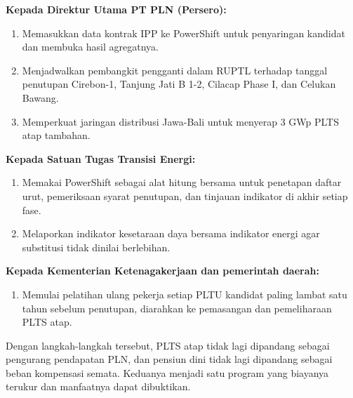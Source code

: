 \textbf{Kepada Direktur Utama PT PLN (Persero):}
\begin{enumerate}[resume]
  \item Memasukkan data kontrak IPP ke PowerShift untuk penyaringan kandidat dan membuka hasil agregatnya.
  \item Menjadwalkan pembangkit pengganti dalam RUPTL terhadap tanggal penutupan Cirebon-1, Tanjung Jati B 1-2, Cilacap Phase I, dan Celukan Bawang.
  \item Memperkuat jaringan distribusi Jawa-Bali untuk menyerap 3 GWp PLTS atap tambahan.
\end{enumerate}

\textbf{Kepada Satuan Tugas Transisi Energi:}
\begin{enumerate}[resume]
  \item Memakai PowerShift sebagai alat hitung bersama untuk penetapan daftar urut, pemeriksaan syarat penutupan, dan tinjauan indikator di akhir setiap fase.
  \item Melaporkan indikator kesetaraan daya bersama indikator energi agar substitusi tidak dinilai berlebihan.
\end{enumerate}

\textbf{Kepada Kementerian Ketenagakerjaan dan pemerintah daerah:}
\begin{enumerate}[resume]
  \item Memulai pelatihan ulang pekerja setiap PLTU kandidat paling lambat satu tahun sebelum penutupan, diarahkan ke pemasangan dan pemeliharaan PLTS atap.
\end{enumerate}

Dengan langkah-langkah tersebut, PLTS atap tidak lagi dipandang sebagai pengurang pendapatan PLN, dan pensiun dini tidak lagi dipandang sebagai beban kompensasi semata. Keduanya menjadi satu program yang biayanya terukur dan manfaatnya dapat dibuktikan.
